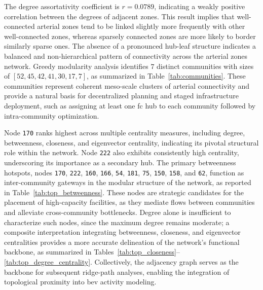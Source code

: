 The degree assortativity coefficient is $r = 0.0789$, indicating a weakly positive correlation between the degrees of adjacent zones. This result implies that well-connected arterial zones tend to be linked slightly more frequently with other well-connected zones, whereas sparsely connected zones are more likely to border similarly sparse ones. The absence of a pronounced hub-leaf structure indicates a balanced and non-hierarchical pattern of connectivity across the arterial zones network. Greedy modularity analysis identifies $7$ distinct communities with sizes of $[52 ,45 ,42 ,41 ,30 ,17 ,7]$, as summarized in Table~\ref{tab:communities}. These communities represent coherent meso-scale clusters of arterial connectivity and provide a natural basis for decentralized planning and staged infrastructure deployment, such as assigning at least one \gls{fc} hub to each community followed by intra-community optimization.

Node \texttt{170} ranks highest across multiple centrality measures, including degree, betweenness, closeness, and eigenvector centrality, indicating its pivotal structural role within the network. Node \texttt{222} also exhibits consistently high centrality, underscoring its importance as a secondary hub. The primary betweenness hotspots, nodes \texttt{170}, \texttt{222}, \texttt{160}, \texttt{166}, \texttt{54}, \texttt{181}, \texttt{75}, \texttt{150}, \texttt{158}, and \texttt{62}, function as inter-community gateways in the modular structure of the network, as reported in Table~\ref{tab:top_betweenness}. These nodes are strategic candidates for the placement of high-capacity facilities, as they mediate flows between communities and alleviate cross-community bottlenecks. Degree alone is insufficient to characterize such nodes, since the maximum degree remains moderate; a composite interpretation integrating betweenness, closeness, and eigenvector centralities provides a more accurate delineation of the network’s functional backbone, as summarized in Tables~\ref{tab:top_closeness}--\ref{tab:top_degree_centrality}.
Collectively, the adjacency graph serves as the backbone for subsequent ridge-path analyses, enabling the integration of topological proximity into \gls{bev} activity modeling.
